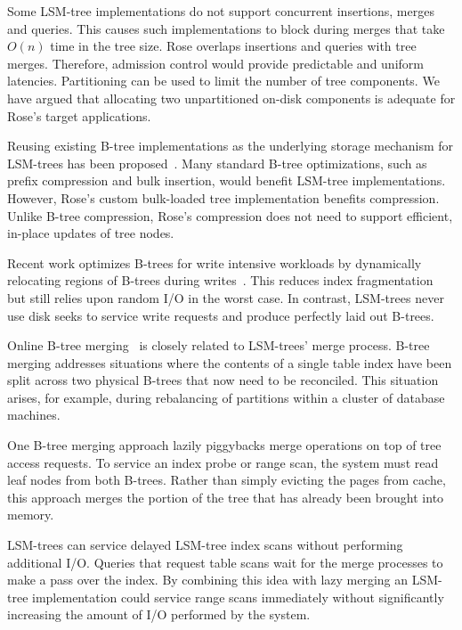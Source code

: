 \documentclass{vldb}
\newcommand{\rows}{Rose\xspace}
\newcommand{\rowss}{Rose's\xspace}
\begin{document}
Some LSM-tree implementations do not support concurrent insertions,
merges and queries.  This causes such implementations to block during
merges that take $O(n)$ time in the tree size.
\rows overlaps insertions and queries with tree merges.  Therefore,
admission control would provide predictable and uniform latencies.
Partitioning can be used to limit the number of tree components.  We
have argued that allocating two unpartitioned on-disk components is adequate for
\rowss target applications.

Reusing existing B-tree implementations as
the underlying storage mechanism for LSM-trees has been proposed~\cite{cidrPartitionedBTree}.  Many
standard B-tree optimizations, such as prefix compression and bulk insertion,
would benefit LSM-tree implementations.  However, \rowss custom bulk-loaded tree
implementation benefits compression.  Unlike B-tree compression, \rowss
compression does not need to support
efficient, in-place updates of tree nodes.

Recent work optimizes B-trees for write intensive workloads by dynamically
relocating regions of B-trees during
writes~\cite{bTreeHighUpdateRates}.  This reduces index fragmentation
but still relies upon random I/O in the worst case.  In contrast,
LSM-trees never use disk seeks to service write requests and produce
perfectly laid out B-trees.

Online B-tree merging~\cite{onlineMerging} is closely related to
LSM-trees' merge process.  B-tree merging
addresses situations where the contents of a single table index have
been split across two physical B-trees that now need to be reconciled.
This situation arises, for example, during rebalancing of partitions
within a cluster of database machines.

One B-tree merging approach lazily piggybacks merge
operations on top of tree access requests.  To service an index
probe or range scan, the system must read leaf nodes from both B-trees.
Rather than simply evicting the pages from cache, this approach merges
the portion of the tree that has already been brought into
memory.

LSM-trees can service delayed
LSM-tree index scans without performing additional I/O.  Queries that request table scans wait for
the merge processes to make a pass over the index.
By combining this idea with lazy merging an LSM-tree implementation
could service
range scans immediately without significantly increasing the amount of
I/O performed by the system.
\end{document}
